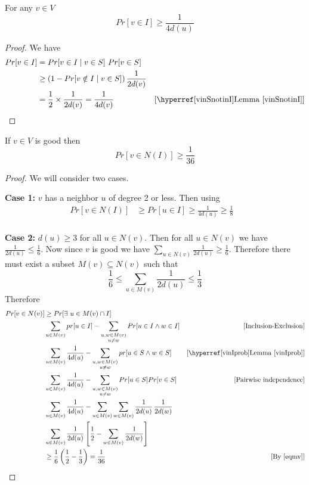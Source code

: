 \begin{lemma}\label{vinIprob}
		For any $v\in V$ $$Pr[v\in I]\geq \frac{1}{4d(u)}$$
\end{lemma}
\begin{proof}
	We have \begin{align*}
		Pr[v\in I] & = Pr[v\in I\mid v\in S]\ Pr[v\in S]                      &                             \\
		           & \geq \lt(1-Pr[v\notin I\mid v\in S]\rt)\frac{1}{2d(v)}   &                             \\
		           & =\frac12 \times \frac{1}{2d(v)}           =\frac1{4d(v)} & [\text{\lmref{vinSnotinI}}]
	\end{align*}
\end{proof}

\begin{lemma}\label{goodvinnbhd136}
	If $v\in V$ is good then $$Pr[v\in N(I)]\geq \frac1{36}$$
\end{lemma}
\begin{proof}
	We will consider two cases. \parinf
	
	\textbf{Case 1:} $v$ has a neighbor $u$ of degree 2 or less. Then using \begin{align*}
		Pr[v\in N(I)] & \geq Pr[u\in I] \geq \frac{1}{4d(u)}\geq \frac18 & \\
	\end{align*}

\textbf{Case 2:} $d(u)\geq 3$ for all $u\in N(v)$. Then for all $u\in N(v)$ we have $\frac{1}{2{d(u)}}\leq \frac16$. Now  since $v$ is good we have $\sum\limits_{u\in N(v)}\frac1{2d(u)}\geq \frac16$. Therefore there must exist a subset $M(v)\subseteq N(v)$ such that \begin{equation}
	\frac16\leq \sum\limits_{u\in M(v)}\frac1{2d(u)}\leq \frac13\label{eqmv}
\end{equation}Therefore \begin{align*}
	Pr[v\in N(v)] & \geq Pr[\exs\ u\in M(v)\cap I]\\
	& \sum_{u\in M(v)}pr[u\in I]-\sum_{\substack{u,w\in M(v)\\ u\neq w}}Pr[u\in I\wedge w\in I] & [\text{Inclusion-Exclusion}]\\
	& \sum_{u\in M(v)}\frac{1}{4d(u)}  - \sum_{\substack{u,w\in M(v)\\ u\neq w}} pr[u\in S\wedge w\in S] & [\text{\lmref{vinIprob}}]\\
	& \sum_{u\in M(v)}\frac1{4d(u)} - \sum_{\substack{u,w\in M(v)\\ u\neq w}}Pr[u\in S]Pr[v\in S] & [\text{Pairwise independence}]\\
	& \sum_{u\in M(v)}\frac1{4d(u)} - \sum_{u\in M(v)}\sum_{w\in M(v)} \frac{1}{2d(u)} \, \frac1{2d(w)} \\
	& \sum_{u\in M(v)}\frac1{2d(u)} \lt[\frac12- \sum_{w\in M(v)}\frac{1}{2d(w)}  \rt]\\ 
	& \geq \frac16 \lt(\frac12-\frac13\rt)=\frac1{36}& [\text{By \eqref{eqmv}}]
\end{align*}
\end{proof}

